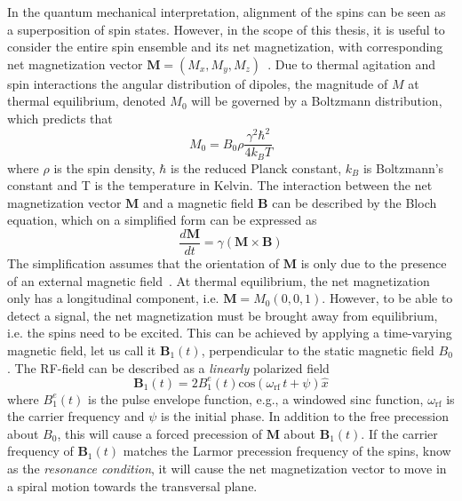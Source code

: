 In the quantum mechanical interpretation, alignment of the spins can be seen as a superposition of spin states. However, in the scope of this thesis, it is useful to consider the entire spin ensemble and its net magnetization, with corresponding net magnetization vector $\textbf{M} = (M_x, M_y, M_z)$~\cite{Levitt2001}. Due to thermal agitation and spin interactions the angular distribution of dipoles, the magnitude of $M$ at thermal equilibrium, denoted $M_0$ will be governed by a Boltzmann distribution, which predicts that
\begin{equation}
\label{eq:M0}
    M_0 = B_0\rho\frac{\gamma^2 \hbar^2}{4k_BT}
\end{equation}
where $\rho$ is the spin density, $\hbar$ is the reduced Planck constant, $k_B$ is Boltzmann's constant and T is the temperature in Kelvin.
The interaction between the net magnetization vector $\textbf{M}$ and a magnetic field $\textbf{B}$ can be described by the Bloch equation, which on a simplified form
can be expressed as
\begin{equation}
\label{eq:bloch1}
    \frac{d\textbf{M}}{dt} = \gamma(\textbf{M} \times \textbf{B})
\end{equation}
The simplification assumes that the orientation of $\textbf{M}$ is only due to the presence of an external magnetic field~\cite{Bloch1946}. At thermal equilibrium, the net magnetization only has a longitudinal component, i.e. $\textbf{M} = M_0(0, 0, 1)$. However, to be able to detect a signal, the net magnetization must be brought away from equilibrium, i.e. the spins need to be excited. This can be achieved by applying a time-varying magnetic field, let us call it $\textbf{B}_1(t)$, perpendicular to the static magnetic field $B_0$. The RF-field can be described as a \emph{linearly} polarized field
\begin{equation}
    \textbf{B}_1(t) = 2B_1^e(t)\textrm{cos}(\omega_{\textrm{rf}}\, t+\psi)\hat x
\end{equation}
where $B_1^e(t)$ is the pulse envelope function, e.g., a windowed sinc function, $\omega_{\textrm{rf}}$ is the carrier frequency and $\psi$ is the initial phase. In addition to the free precession about $B_0$, this will cause a forced precession of $\textbf{M}$ about $\textbf{B}_1(t)$. If the carrier frequency of $\textbf{B}_1(t)$ matches the Larmor precession frequency of the spins, know as the \emph{resonance condition}, it will cause the net magnetization vector to move in a spiral motion towards the transversal plane.

